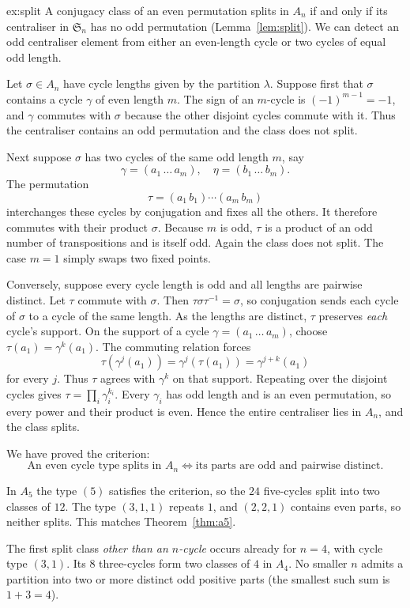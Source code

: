 \begin{solution}{ex:split}
\idea A conjugacy class of an even permutation splits in $A_n$ if and only if its centraliser in $\mathfrak S_n$ has no odd permutation (Lemma~\ref{lem:split}). We can detect an odd centraliser element from either an even-length cycle or two cycles of equal odd length.

\writeup Let $\sigma\in A_n$ have cycle lengths given by the partition $\lambda$. Suppose first that $\sigma$ contains a cycle $\gamma$ of even length $m$. The sign of an $m$-cycle is $(-1)^{m-1}=-1$, and $\gamma$ commutes with $\sigma$ because the other disjoint cycles commute with it. Thus the centraliser contains an odd permutation and the class does not split.

Next suppose $\sigma$ has two cycles of the same odd length $m$, say
\[
\gamma=(a_1\,\ldots\,a_m),\quad
\eta=(b_1\,\ldots\,b_m).
\]
The permutation
\[
\tau=(a_1\,b_1)\cdots(a_m\,b_m)
\]
interchanges these cycles by conjugation and fixes all the others. It therefore commutes with their product $\sigma$. Because $m$ is odd, $\tau$ is a product of an odd number of transpositions and is itself odd. Again the class does not split. The case $m=1$ simply swaps two fixed points.

Conversely, suppose every cycle length is odd and all lengths are pairwise distinct. Let $\tau$ commute with $\sigma$. Then $\tau\sigma\tau^{-1}=\sigma$, so conjugation sends each cycle of $\sigma$ to a cycle of the same length. As the lengths are distinct, $\tau$ preserves \emph{each} cycle's support. On the support of a cycle $\gamma=(a_1\,\ldots\,a_m)$, choose $\tau(a_1)=\gamma^k(a_1)$. The commuting relation forces
\[
\tau(\gamma^j(a_1))=\gamma^j(\tau(a_1))=\gamma^{j+k}(a_1)
\]
for every $j$. Thus $\tau$ agrees with $\gamma^k$ on that support. Repeating over the disjoint cycles gives $\tau=\prod_i\gamma_i^{k_i}$. Every $\gamma_i$ has odd length and is an even permutation, so every power and their product is even. Hence the entire centraliser lies in $A_n$, and the class splits.

We have proved the criterion:
\[
\boxed{\text{An even cycle type splits in }A_n
\iff\text{its parts are odd and pairwise distinct}.}
\]

In $A_5$ the type $(5)$ satisfies the criterion, so the $24$ five-cycles split into two classes of $12$. The type $(3,1,1)$ repeats $1$, and $(2,2,1)$ contains even parts, so neither splits. This matches Theorem~\ref{thm:a5}.

The first split class \emph{other than an $n$-cycle} occurs already for $n=4$, with cycle type $(3,1)$. Its $8$ three-cycles form two classes of $4$ in $A_4$. No smaller $n$ admits a partition into two or more distinct odd positive parts (the smallest such sum is $1+3=4$).
\end{solution}

